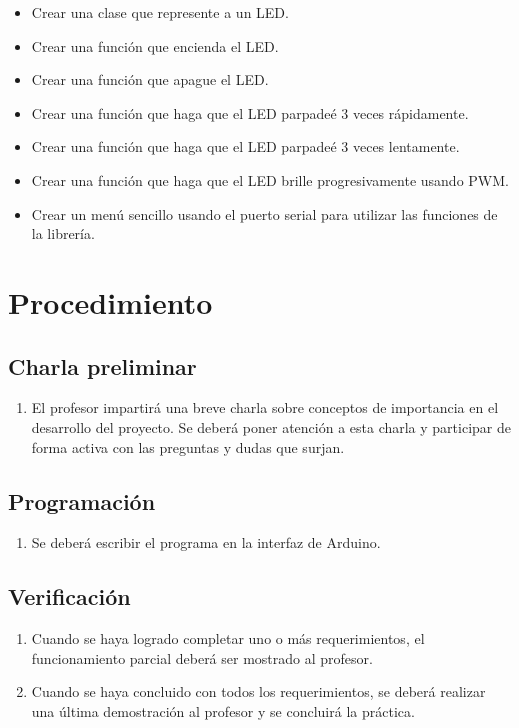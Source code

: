 \documentclass[12pt,letterpaper]{IEEEtran}
\begin{document}
\begin{itemize}
	\item Crear una clase que represente a un LED.
	\item Crear una función que encienda el LED.
	\item Crear una función que apague el LED.
	\item Crear una función que haga que el LED parpadeé 3 veces rápidamente.
	\item Crear una función que haga que el LED parpadeé 3 veces lentamente.
	\item Crear una función que haga que el LED brille progresivamente usando PWM.
	\item Crear un menú sencillo usando el puerto serial para utilizar las funciones de la librería.
\end{itemize}

\section{Procedimiento}

\subsection{Charla preliminar}

\begin{enumerate}
	\item El profesor impartirá una breve charla sobre conceptos de importancia en el desarrollo del proyecto. Se deberá poner atención a esta charla y participar de forma activa con las preguntas y dudas que surjan.
\end{enumerate}


\subsection{Programación}

\begin{enumerate}[resume]
	\item Se deberá escribir el programa en la interfaz de Arduino.
\end{enumerate}

\subsection{Verificación}

\begin{enumerate}[resume]
	\item Cuando se haya logrado completar uno o más requerimientos, el funcionamiento parcial deberá ser mostrado al profesor.
	\item Cuando se haya concluido con todos los requerimientos, se deberá realizar una última demostración al profesor y se concluirá la práctica.
\end{enumerate}
\end{document}
